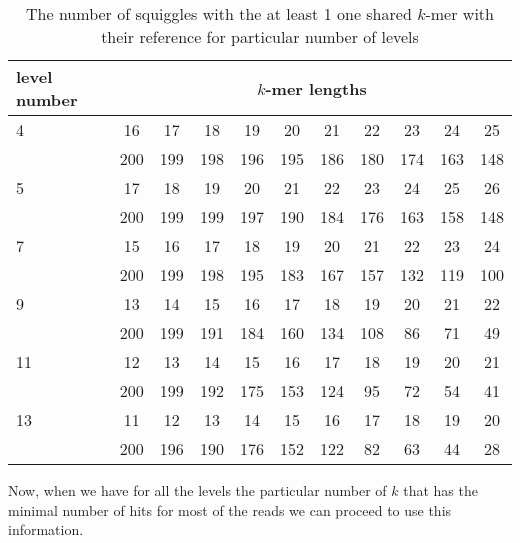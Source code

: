 \begin{table}
\caption[TODO]{The number of squiggles with the at least 1 one shared $k$-mer with their
reference for particular number of levels}
\label{tab:sharedKmers}
\begin{center}
\begin{tabular}{|l|c|c|c|c|c|c|c|c|c|c|}
\hline
level number & \multicolumn{10}{|c|}{$k$-mer lengths} \\
\hline
4 & 16 & 17 & 18 & 19 & 20 & 21 & 22 & 23 & 24 & 25 \\\cline{2-11}
& 200 & 199 & 198 & 196 & 195 & 186 & 180 & 174 & 163 & 148 \\\cline{2-11}
\hline
5 & 17 & 18 & 19 & 20 & 21 & 22 & 23 & 24 & 25 & 26 \\\cline{2-11}
& 200 & 199 & 199 & 197 & 190 & 184 & 176 & 163 & 158 & 148 \\\cline{2-11}
\hline
7 & 15 & 16 & 17 & 18 & 19 & 20 & 21 & 22 & 23 & 24 \\\cline{2-11}
& 200 & 199 & 198 & 195 & 183 & 167 & 157 & 132 & 119 & 100 \\\cline{2-11}
\hline
9 & 13 & 14 & 15 & 16 & 17 & 18 & 19 & 20 & 21 & 22 \\\cline{2-11}
& 200 & 199 & 191 & 184 & 160 & 134 & 108 & 86 & 71 & 49 \\\cline{2-11}
\hline
11 & 12 & 13 & 14 & 15 & 16 & 17 & 18 & 19 & 20 & 21 \\\cline{2-11}
& 200 & 199 & 192 & 175 & 153 & 124 & 95 & 72 & 54 & 41 \\\cline{2-11}
\hline
13 & 11 & 12 & 13 & 14 & 15 & 16 & 17 & 18 & 19 & 20 \\\cline{2-11}
& 200 & 196 & 190 & 176 & 152 & 122 & 82 & 63 & 44 & 28 \\\cline{2-11}
\hline
\end{tabular}
\end{center}
\end{table}

Now, when we have for all the levels the particular number of $k$ that
has the minimal number of hits for most of the reads we can proceed to use
this information.
